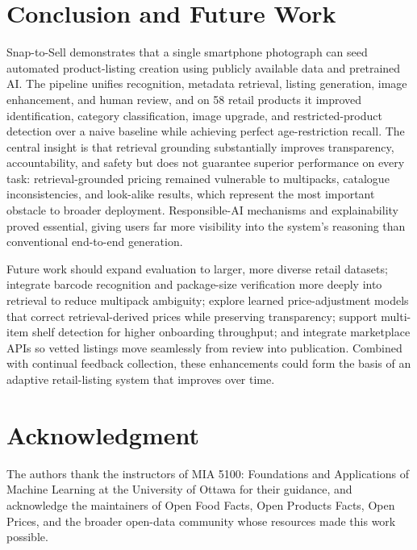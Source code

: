 \documentclass[conference]{IEEEtran}
\begin{document}
\section{Conclusion and Future Work}

Snap-to-Sell demonstrates that a single smartphone photograph can seed automated
product-listing creation using publicly available data and pretrained AI. The
pipeline unifies recognition, metadata retrieval, listing generation, image
enhancement, and human review, and on 58 retail products it improved
identification, category classification, image upgrade, and restricted-product
detection over a naive baseline while achieving perfect age-restriction recall.
The central insight is that retrieval grounding substantially improves
transparency, accountability, and safety but does not guarantee superior
performance on every task: retrieval-grounded pricing remained vulnerable to
multipacks, catalogue inconsistencies, and look-alike results, which represent
the most important obstacle to broader deployment. Responsible-AI mechanisms and
explainability proved essential, giving users far more visibility into the
system's reasoning than conventional end-to-end generation.

Future work should expand evaluation to larger, more diverse retail datasets;
integrate barcode recognition and package-size verification more deeply into
retrieval to reduce multipack ambiguity; explore learned price-adjustment models
that correct retrieval-derived prices while preserving transparency; support
multi-item shelf detection for higher onboarding throughput; and integrate
marketplace APIs so vetted listings move seamlessly from review into
publication. Combined with continual feedback collection, these enhancements
could form the basis of an adaptive retail-listing system that improves over
time.

\section*{Acknowledgment}
The authors thank the instructors of MIA 5100: Foundations and Applications of Machine Learning at the 
University of Ottawa for their guidance, and acknowledge the maintainers of Open Food Facts, Open
Products Facts, Open Prices, and the broader open-data community whose resources
made this work possible.



\end{document}
